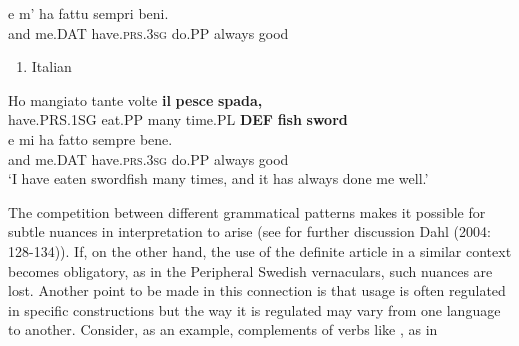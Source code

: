 \ea\label{}
\gll e  m’  ha  fattu  sempri  beni.\\


and  me.DAT  have.\textsc{prs.3sg}  do.PP  always  good\\ %


\begin{enumerate} %
\item 
Italian

\end{enumerate} %
\ea\label{}
\gll Ho  mangiato  tante  volte  \textbf{il} \textbf{pesce} \textbf{spada,}\\


have.PRS.1SG  eat.PP  many  time.PL  \textbf{DEF} \textbf{fish} \textbf{sword}\\ %


\ea\label{}
\gll e  mi  ha  fatto  sempre  bene.\\


and  me.DAT  have.\textsc{prs.3sg}  do.PP  always  good\\ %


‘I have eaten swordfish many times, and it has always done me well.’
\z


The competition between different grammatical patterns makes it possible for subtle nuances in interpretation to arise (see for further discussion Dahl (2004: 128-134)). If, on the other hand, the use of the definite article in a similar context becomes obligatory, as in the Peripheral Swedish vernaculars, such nuances are lost. Another point to be made in this connection is that usage is often regulated in specific constructions but the way it is regulated may vary from one language to another. Consider, as an example, complements of verbs like , as in

